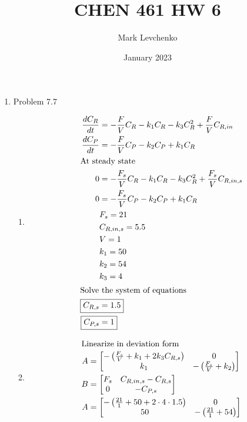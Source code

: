 \documentclass[12pt]{article}
\title{CHEN 461 HW 6}
\author{Mark Levchenko}
\date{January 2023}
\begin{document}
\begin{enumerate}

\newpage
\item Problem 7.7
\begin{enumerate}
    \item 
    \begin{align*}
        \frac{dC_R}{dt} &= -\frac{F}{V} C_R - k_1 C_R - k_3 C_R^2 + \frac{F}{V} C_{R,in} \\
        \frac{dC_P}{dt} &= -\frac{F}{V} C_P - k_2 C_P + k_1 C_R \\
        \intertext{At steady state}
        0 &= -\frac{F_s}{V} C_R - k_1 C_R - k_3 C_R^2 + \frac{F_s}{V} C_{R,in,s} \\
        0 &= -\frac{F_s}{V} C_P - k_2 C_P + k_1 C_R \\
        & F_s = 21 \\
        & C_{R,in,s} = 5.5 \\
        & V = 1 \\
        & k_1 = 50 \\
        & k_2 = 54 \\
        & k_3 = 4 \\
        \intertext{Solve the system of equations}
        \Aboxed{C_{R,s} &= 1.5} \\
        \Aboxed{C_{P,s} &= 1}
    \end{align*}
    \item 
    \begin{align*}
        \intertext{Linearize in deviation form}
        A &= \begin{bmatrix}
            -\left(\frac{F_s}{V} + k_1 + 2 k_3 C_{R,s}\right) & 0 \\
            k_1 & -\left(\frac{F_s}{V} + k_2\right) \\
        \end{bmatrix} \\
        B &= \begin{bmatrix}
            F_s & C_{R,in,s} - C_{R,s} \\
            0 & -C_{P,s} \\
        \end{bmatrix} \\
        A &= \begin{bmatrix}
            -\left(\frac{21}{1} + 50 + 2 \cdot 4  \cdot 1.5 \right) & 0 \\
            50 & -\left(\frac{21}{1} + 54\right) \\

\end{bmatrix}
\end{align*}
\end{enumerate}
\end{enumerate}
\end{document}
